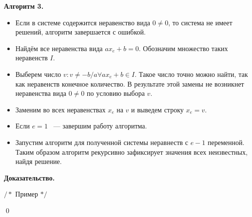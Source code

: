 \documentclass[14pt]{mmcs-article}
\begin{document}


\textbf{Алгоритм 3.}

\begin{itemize}
    \item Если в системе содержится неравенство вида $0 \neq 0$, то система не имеет решений, алгоритм завершается с ошибкой.
    \item Найдём все неравенства  вида $a x_e + b = 0$. Обозначим множество таких неравенств $I$.
    \item Выберем число $v: v \neq -b/a \forall a x_e + b \in I$. Такое число точно можно найти, так как неравенств конечное количество. В результате этой замены не возникнет неравенства вида $0 \neq 0$ по условию выбора $v$.
    \item Заменим во всех неравенствах $x_e$ на $v$ и выведем строку $x_e = v$.
    \item Если $e = 1$ ~--- завершим работу алгоритма.
    \item Запустим алгоритм для полученной системы неравнеств с $e - 1$ переменной. Таким образом алгоритм рекурсивно зафиксирует значения всех неизвестных, найдя решение.
\end{itemize}

\textbf{Доказательство.}




$/*$ Пример $*/$

\qed

\end{document}
